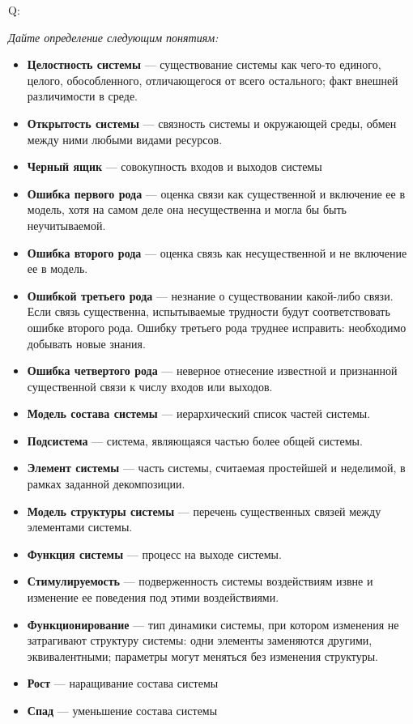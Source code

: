 \documentclass{article}
\newcommand{\define}[2]{
	\textbf{#1} --- #2
	}
\newcommand{\question}[2]{
	\begin{flushright}
		Q:\hspace{2ex}\vline\hspace{2ex}
		\begin{minipage}{0.9\textwidth}
			\large
			\textit{#1}
		\end{minipage}
	\end{flushright}
	\begin{center}
		\begin{minipage}{0.95\textwidth}
			#2
		\end{minipage}
	\end{center}
	}
\begin{document}
\question{Дайте определение следующим понятиям:}{
	\begin{itemize}
		\item \define{Целостность системы}{существование системы как чего-то единого, целого, обособленного, отличающегося от всего остального; факт внешней различимости в среде.}
		\item \define{Открытость системы}{связность системы и окружающей среды, обмен между ними любыми видами ресурсов.}
		\item \define{Черный ящик}{совокупность входов и выходов системы}
		\item \define{Ошибка первого рода}{оценка связи как существенной и включение ее в модель, хотя на самом деле она несущественна и могла бы быть неучитываемой.}
		\item \define{Ошибка второго рода}{оценка связь как несущественной и не включение ее в модель.}
		\item \define{Ошибкой третьего рода}{незнание о существовании какой-либо связи. Если связь существенна, испытываемые трудности будут соответствовать ошибке второго рода. Ошибку третьего рода труднее исправить: необходимо добывать новые знания.}
		\item \define{Ошибка четвертого рода}{неверное отнесение известной и признанной существенной связи к числу входов или выходов.}
		\item \define{Модель состава системы}{иерархический список частей системы.}
		\item \define{Подсистема}{система, являющаяся частью более общей системы.}
		\item \define{Элемент системы}{часть системы, считаемая простейшей и неделимой, в рамках заданной декомпозиции.}
		\item \define{Модель структуры системы}{перечень существенных связей между элементами системы.}
		\item \define{Функция системы}{процесс на выходе системы.}
		\item \define{Стимулируемость}{подверженность системы воздействиям извне и изменение ее поведения под этими воздействиями.}
		\item \define{Функционирование}{тип динамики системы, при котором изменения не затрагивают структуру системы: одни элементы заменяются другими, эквивалентными; параметры могут меняться без изменения структуры.}
		\item \define{Рост}{наращивание состава системы}
		\item \define{Спад}{уменьшение состава системы}

\end{itemize}}
\end{document}
